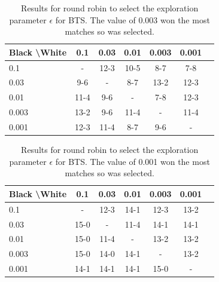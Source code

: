 \documentclass{article}
\theoremstyle{plain}
\begin{document}
\begin{appendices}
            \begin{table}[]
            \centering
                \begin{tabular}{l|cccccc}
                    \textbf{Black \textbackslash White}     & 0.1  & 0.03   & 0.01   & 0.003    & 0.001    \\ 
                    \hline
                                            0.1            & - & 12-3 & 10-5 & 8-7 & 7-8   		\\
                                            0.03            & 9-6 & - & 8-7 & 13-2 & 12-3   		\\
                                            0.01          & 11-4 & 9-6 & - & 7-8 & 12-3   		\\
                                            0.003          & 13-2 & 9-6 & 11-4 & - & 11-4   		\\
                                            0.001         & 12-3 & 11-4 & 8-7 & 9-6 &   -   	\\    
                \end{tabular}
                \caption{Results for round robin to select the exploration parameter $\epsilon$ for BTS. The value of 0.003 won the most matches so was selected. \label{tab:w030}}
            \end{table}
            
            \begin{table}[]
            \centering
                \begin{tabular}{l|cccccc}
                    \textbf{Black \textbackslash White}     & 0.1  & 0.03   & 0.01   & 0.003    & 0.001    \\ 
                    \hline
                                            0.1            & - & 12-3 & 14-1 & 12-3 & 13-2   		\\
                                            0.03            & 15-0 & - & 11-4 & 14-1 & 14-1   		\\
                                            0.01          & 15-0 & 11-4 & - & 13-2 & 13-2   		\\
                                            0.003          & 15-0 & 14-0 & 14-1 & - & 13-2   		\\
                                            0.001         & 14-1 & 14-1 & 14-1 & 15-0 &   -   	\\    
                \end{tabular}
                \caption{Results for round robin to select the exploration parameter $\epsilon$ for BTS. The value of 0.001 won the most matches so was selected. \label{tab:x030}}
            \end{table}
            

\end{appendices}
\end{document}
